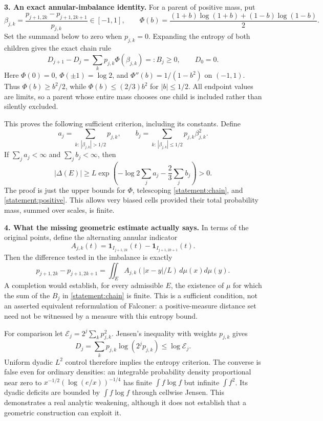 \documentclass[11pt,a4paper]{article}
\begin{document}
\textbf{3. An exact annular-imbalance identity.}
For a parent of positive mass, put
\[
 \beta_{j,k}=\frac{p_{j+1,2k}-p_{j+1,2k+1}}{p_{j,k}}\in[-1,1],
 \qquad
 \Phi(b)=\frac{(1+b)\log(1+b)+(1-b)\log(1-b)}2.
\]
Set the summand below to zero when $p_{j,k}=0$. Expanding the entropy of
both children gives the exact chain rule
\begin{equation}\label{statement:chain}
 D_{j+1}-D_j=\sum_k p_{j,k}\Phi(\beta_{j,k})=:B_j\ge0,
 \qquad D_0=0.
\end{equation}
Here $\Phi(0)=0$, $\Phi(\pm1)=\log2$, and
$\Phi''(b)=1/(1-b^2)$ on $(-1,1)$.
Thus $\Phi(b)\ge b^2/2$, while $\Phi(b)\le(2/3)b^2$ for $|b|\le1/2$.
All endpoint values are limits, so a parent whose entire mass chooses one
child is included rather than silently excluded.

This proves the following sufficient criterion, including its constants.
Define
\[
 a_j=\sum_{k:\,|\beta_{j,k}|>1/2}p_{j,k},\qquad
 b_j=\sum_{k:\,|\beta_{j,k}|\le1/2}p_{j,k}\beta_{j,k}^2.
\]
If $\sum_j a_j<\infty$ and $\sum_j b_j<\infty$, then
\begin{equation}\label{statement:budget}
 |\Delta(E)|\ge
 L\exp\left(-\log2\sum_j a_j-\frac23\sum_j b_j\right)>0.
\end{equation}
The proof is just the upper bounds for $\Phi$, telescoping
\eqref{statement:chain}, and \eqref{statement:positive}. This allows very biased cells
provided their total probability mass, summed over scales, is finite.

\textbf{4. What the missing geometric estimate actually says.}
In terms of the original points, define the alternating annular indicator
\[
 A_{j,k}(t)=\mathbf1_{I_{j+1,2k}}(t)-\mathbf1_{I_{j+1,2k+1}}(t).
\]
Then the difference tested in the imbalance is exactly
\[
 p_{j+1,2k}-p_{j+1,2k+1}
   =\iint_E A_{j,k}(|x-y|/L)\,d\mu(x)d\mu(y).
\]
A completion would establish, for every admissible $E$, the existence of
$\mu$ for which the sum of the $B_j$ in \eqref{statement:chain} is finite.
This is a sufficient condition, not an asserted equivalent reformulation
of Falconer: a positive-measure distance set need not be witnessed by a
measure with this entropy bound.

For comparison let $\mathcal E_j=2^j\sum_kp_{j,k}^2$. Jensen's inequality
with weights $p_{j,k}$ gives
\[
 D_j=\sum_kp_{j,k}\log(2^jp_{j,k})\le\log\mathcal E_j.
\]
Uniform dyadic $L^2$ control therefore implies the entropy criterion. The
converse is false even for ordinary densities: an integrable probability
density proportional near zero to
$x^{-1/2}(\log(e/x))^{-1/4}$ has finite $\int f\log f$ but infinite
$\int f^2$. Its dyadic deficits are bounded by $\int f\log f$ through
cellwise Jensen. This demonstrates a real analytic weakening, although
it does not establish that a geometric construction can exploit it.
\end{document}
